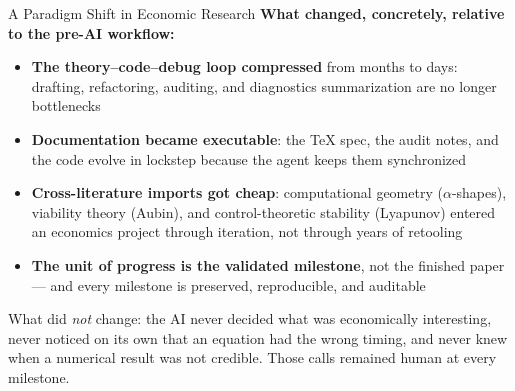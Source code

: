\documentclass[10pt,aspectratio=169]{beamer}
\begin{document}
\begin{frame}{A Paradigm Shift in Economic Research}
\textbf{What changed, concretely, relative to the pre-AI workflow:}

\medskip
\begin{itemize}
    \item \textbf{The theory--code--debug loop compressed} from months to days: drafting,
          refactoring, auditing, and diagnostics summarization are no longer bottlenecks
    \item \textbf{Documentation became executable}: the TeX spec, the audit notes, and the
          code evolve in lockstep because the agent keeps them synchronized
    \item \textbf{Cross-literature imports got cheap}: computational geometry ($\alpha$-shapes),
          viability theory (Aubin), and control-theoretic stability (Lyapunov) entered an
          economics project through iteration, not through years of retooling
    \item \textbf{The unit of progress is the validated milestone}, not the finished paper ---
          and every milestone is preserved, reproducible, and auditable
\end{itemize}

\medskip
\begin{alertblock}{}
What did \emph{not} change: the AI never decided what was economically interesting,
never noticed on its own that an equation had the wrong timing, and never knew when a
numerical result was not credible. Those calls remained human at every milestone.
\end{alertblock}
\end{frame}
\end{document}
